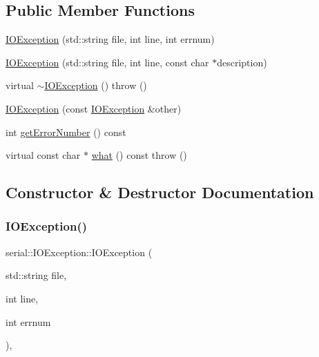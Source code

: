 \subsection*{Public Member Functions}
\begin{DoxyCompactItemize}
\item 
\mbox{\hyperlink{classserial_1_1_i_o_exception_acb2f2cf7a5cc8090945f6cbfcef3ef1e}{I\+O\+Exception}} (std\+::string file, int line, int errnum)
\item 
\mbox{\hyperlink{classserial_1_1_i_o_exception_acc1d2c650832cc8127f2cd777072b2cd}{I\+O\+Exception}} (std\+::string file, int line, const char $\ast$description)
\item 
virtual \mbox{\hyperlink{classserial_1_1_i_o_exception_a026ae2e6abc57c6069915f0f8c701390}{$\sim$\+I\+O\+Exception}} ()  throw ()
\item 
\mbox{\hyperlink{classserial_1_1_i_o_exception_af65196a71b800d11b5e5c367caf5b354}{I\+O\+Exception}} (const \mbox{\hyperlink{classserial_1_1_i_o_exception}{I\+O\+Exception}} \&other)
\item 
int \mbox{\hyperlink{classserial_1_1_i_o_exception_af6b35e13d3d212ab2f7ecbb28a231de4}{get\+Error\+Number}} () const
\item 
virtual const char $\ast$ \mbox{\hyperlink{classserial_1_1_i_o_exception_abd1b0ecb2f1a867ed7ade7c3f3b9dada}{what}} () const  throw ()
\end{DoxyCompactItemize}


\subsection{Constructor \& Destructor Documentation}
\mbox{\label{classserial_1_1_i_o_exception_acb2f2cf7a5cc8090945f6cbfcef3ef1e}} 
\subsubsection{\texorpdfstring{I\+O\+Exception()}{IOException()}\hspace{0.1cm}{\footnotesize\ttfamily [1/3]}}
{\footnotesize\ttfamily serial\+::\+I\+O\+Exception\+::\+I\+O\+Exception (\begin{DoxyParamCaption}\item[{std\+::string}]{file,  }\item[{int}]{line,  }\item[{int}]{errnum }\end{DoxyParamCaption})\hspace{0.3cm}{\ttfamily [inline]}, {\ttfamily [explicit]}}


